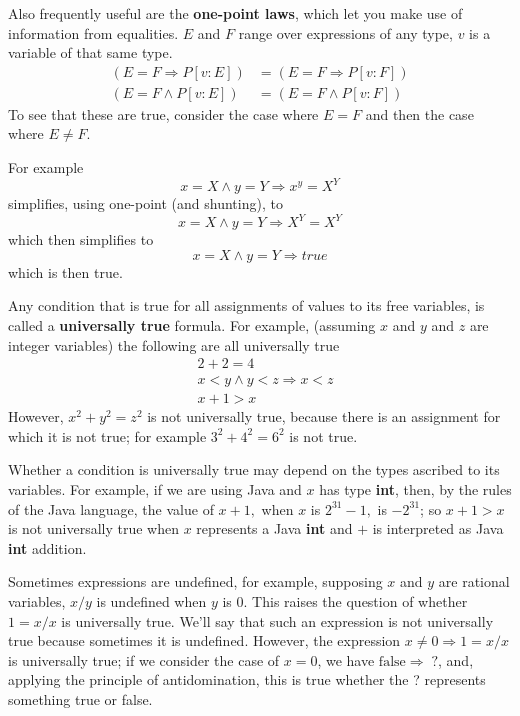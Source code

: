\documentclass[muchmore,11pt]{article}%
\begin{document}
Also frequently useful are the \textbf{one-point laws}, which let you make use
of information from equalities. $E$ and $F$ range over expressions of any
type, $v$ is a variable of that same type.
\begin{align*}
\left(  E=F\Rightarrow P[v:E]\right)   &  =\left(  E=F\Rightarrow
P[v:F]\right) \\
\left(  E=F\wedge P[v:E]\right)   &  =\left(  E=F\wedge P[v:F]\right)
\end{align*}
To see that these are true, consider the case where $E=F$ and then the case
where $E\neq F$.

For example%
\[
x=X\wedge y=Y\Rightarrow x^{y}=X^{Y}%
\]
simplifies, using one-point (and shunting), to%
\[
x=X\wedge y=Y\Rightarrow X^{Y}=X^{Y}%
\]
which then simplifies to%
\[
x=X\wedge y=Y\Rightarrow\mathit{true}%
\]
which is then true.

Any condition that is true for all assignments of values to its free
variables, is called a \textbf{universally true} formula. For example,
(assuming $x$ and $y$ and $z$ are integer variables) the following are all
universally true%
\begin{align*}
&  \left.  2+2=4\right. \\
&  \left.  x<y\wedge y<z\Rightarrow x<z\right. \\
&  \left.  x+1>x\right.
\end{align*}
However, $x^{2}+y^{2}=z^{2}$ is not universally true, because there is an
assignment for which it is not true; for example $3^{2}+4^{2}=6^{2}$ is not true.

Whether a condition is universally true may depend on the types ascribed to
its variables. For example, if we are using Java and $x$ has type
\textbf{int}, then, by the rules of the Java language, the value of $x+1,$
when $x$ is $2^{31}-1,$ is $-2^{31}$; so $x+1>x$ is not universally true when
$x$ represents a Java \textbf{int} and $+$ is interpreted as Java \textbf{int} addition.

Sometimes expressions are undefined, for example, supposing $x$ and $y$ are
rational variables, $x/y$ is undefined when $y$ is $0$. This raises the
question of whether $1=x/x$ is universally true. We'll say that such an
expression is not universally true because sometimes it is undefined.
However, the expression $x\neq 0\Rightarrow1=x/x$ is universally true;
if we consider the case of $x=0$, we
have $\mathrm{false}\Rightarrow\;?$, and, applying the principle of
antidomination, this is $\mathrm{true}$ whether the ? represents something true or false.
\end{document}
